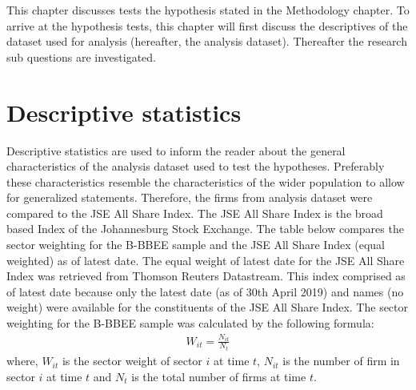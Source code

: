 This chapter discusses tests the hypothesis stated in the Methodology chapter. To arrive at the hypothesis tests, this chapter will first discuss the descriptives of the dataset used for analysis (hereafter, the analysis dataset). Thereafter the research sub questions are investigated.
\section{Descriptive statistics}
Descriptive statistics are used to inform the reader about the general characteristics of the analysis dataset used to test the hypotheses. Preferably these characteristics resemble the characteristics of the wider population to allow for generalized statements. Therefore, the firms from analysis dataset were compared to the JSE All Share Index. The JSE All Share Index is the broad based Index of the Johannesburg Stock Exchange. The table below compares the sector weighting for the B-BBEE sample and the JSE All Share Index (equal weighted) as of latest date. The equal weight of latest date for the JSE All Share Index was retrieved from Thomson Reuters Datastream. This index comprised as of latest date because only the latest date (as of 30th April 2019) and names (no weight) were available for the constituents of the JSE All Share Index. The sector weighting for the B-BBEE sample was calculated by the following formula:
\begin{equation}
\begin{aligned}
W_{it} = \frac{N_{it}}{N_{t}}
\end{aligned}
\end{equation}
where, $W_{it}$ is the sector weight of sector $i$ at time $t$, $N_{it}$ is the number of firm in sector $i$ at time $t$ and $N_{t}$ is the total number of firms at time $t$. 


